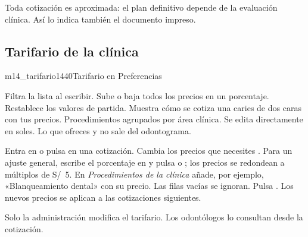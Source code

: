 \documentclass[11pt]{article}
\begin{document}
\begin{sdaviso}
Toda cotización es aproximada: el plan definitivo depende de la evaluación clínica. Así lo indica también el documento impreso.
\end{sdaviso}

\needspace{0.55\textheight}
\subsection{Tarifario de la clínica}\label{sec:tarifario}


\begin{pantalla}{m14_tarifario}{1440}{Tarifario en Preferencias}
\end{pantalla}

\begin{leyenda}
   Filtra la lista al escribir.
   Sube o baja todos los precios en un porcentaje.
   Restablece los valores de partida.
   Muestra cómo se cotiza una caries de dos caras con tus precios.
   Procedimientos agrupados por área clínica.
   Se edita directamente en soles.
   Lo que ofreces y no sale del odontograma.
\end{leyenda}

\begin{pasos}
  \paso Entra en  o pulsa  en una cotización.
  \paso Cambia los precios que necesites . Para un ajuste general, escribe el porcentaje en  y pulsa  o  ; los precios se redondean a múltiplos de S/~5.
  \paso En \textit{Procedimientos de la clínica}  añade, por ejemplo, «Blanqueamiento dental» con su precio. Las filas vacías se ignoran.
  \paso Pulsa . Los nuevos precios se aplican a las cotizaciones siguientes.
\end{pasos}

\begin{sdpermiso}
Solo la administración modifica el tarifario. Los odontólogos lo consultan desde la cotización.
\end{sdpermiso}
\end{document}
